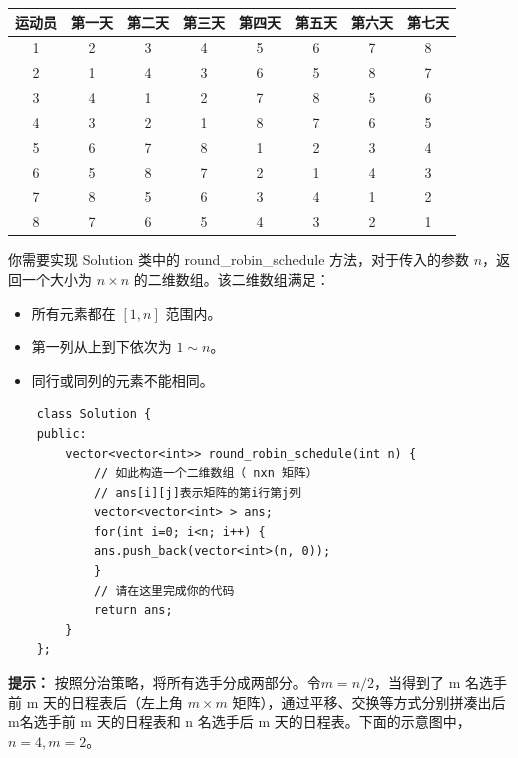 \documentclass[12pt,a4paper]{article}
\begin{document}
\begin{itemize}
          \begin{tabular}{cccccccc}
              \toprule
              运动员 & 第一天 & 第二天 & 第三天 & 第四天 & 第五天 & 第六天 & 第七天 \\
              \midrule
              1   & 2   & 3   & 4   & 5   & 6   & 7   & 8   \\
              2   & 1   & 4   & 3   & 6   & 5   & 8   & 7   \\
              3   & 4   & 1   & 2   & 7   & 8   & 5   & 6   \\
              4   & 3   & 2   & 1   & 8   & 7   & 6   & 5   \\
              5   & 6   & 7   & 8   & 1   & 2   & 3   & 4   \\
              6   & 5   & 8   & 7   & 2   & 1   & 4   & 3   \\
              7   & 8   & 5   & 6   & 3   & 4   & 1   & 2   \\
              8   & 7   & 6   & 5   & 4   & 3   & 2   & 1   \\
              \bottomrule
          \end{tabular}

\end{itemize}


你需要实现 Solution 类中的 round\_robin\_schedule 方法，对于传入的参数 $n$，返回一个大小为 $n\times n$ 的二维数组。该二维数组满足：
\begin{itemize}[noitemsep]
    \item 所有元素都在 $[1, n]$ 范围内。
    \item 第一列从上到下依次为 $1\sim n$。
    \item 同行或同列的元素不能相同。
\end{itemize}


\begin{lstlisting}
    class Solution {
    public:
        vector<vector<int>> round_robin_schedule(int n) {
            // 如此构造一个二维数组（ nxn 矩阵）
            // ans[i][j]表示矩阵的第i行第j列
            vector<vector<int> > ans;
            for(int i=0; i<n; i++) {
            ans.push_back(vector<int>(n, 0));
            }
            // 请在这里完成你的代码
            return ans;
        }
    };
\end{lstlisting}

\textbf{提示：} 按照分治策略，将所有选手分成两部分。令$m=n/2$，当得到了 m 名选手前 m 天的日程表后（左上角 $m\times m$ 矩阵），通过平移、交换等方式分别拼凑出后m名选手前 m 天的日程表和 n 名选手后 m 天的日程表。下面的示意图中，$n=4, m=2$。
\end{document}
